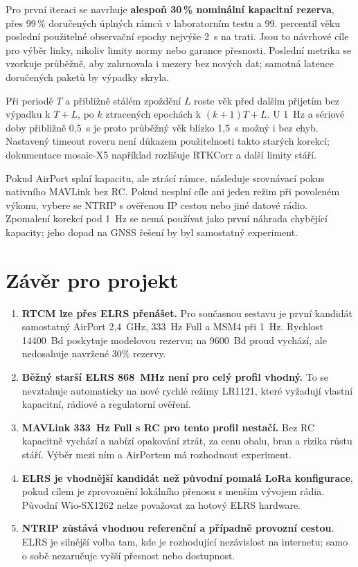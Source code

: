 \documentclass[11pt,a4paper]{article}
\begin{document}
Pro první iteraci se navrhuje \textbf{alespoň 30\,\% nominální kapacitní rezerva}, přes 99\,\% doručených úplných rámců v laboratorním testu a 99. percentil věku poslední použitelné observační epochy nejvýše 2~s na trati. Jsou to návrhové cíle pro výběr linky, nikoliv limity normy nebo garance přesnosti. Poslední metrika se vzorkuje průběžně, aby zahrnovala i mezery bez nových dat; samotná latence doručených paketů by výpadky skryla.

Při periodě $T$ a přibližně stálém zpoždění $L$ roste věk před dalším přijetím bez výpadku k $T+L$, po $k$ ztracených epochách k $(k+1)T+L$. U 1~Hz a sériové doby přibližně 0,5~s je proto průběžný věk blízko 1,5~s možný i bez chyb. Nastavený timeout roveru není důkazem použitelnosti takto starých korekcí; dokumentace mosaic-X5 například rozlišuje RTKCorr a další limity stáří.\cite{mosaic}

Pokud AirPort splní kapacitu, ale ztrácí rámce, následuje srovnávací pokus nativního MAVLink bez RC. Pokud nesplní cíle ani jeden režim při povoleném výkonu, vybere se NTRIP s ověřenou IP cestou nebo jiné datové rádio. Zpomalení korekcí pod 1~Hz se nemá používat jako první náhrada chybějící kapacity; jeho dopad na GNSS řešení by byl samostatný experiment.

\clearpage
\section{Závěr pro projekt}
\begin{enumerate}
\item \textbf{RTCM lze přes ELRS přenášet.} Pro současnou sestavu je první kandidát samostatný AirPort 2,4~GHz, 333~Hz Full a MSM4 při 1~Hz. Rychlost 14400~Bd poskytuje modelovou rezervu; na 9600~Bd proud vychází, ale nedosahuje navržené 30\% rezervy.
\item \textbf{Běžný starší ELRS 868~MHz není pro celý profil vhodný.} To se nevztahuje automaticky na nové rychlé režimy LR1121, které vyžadují vlastní kapacitní, rádiové a regulatorní ověření.
\item \textbf{MAVLink 333~Hz Full s RC pro tento profil nestačí.} Bez RC kapacitně vychází a nabízí opakování ztrát, za cenu obalu, bran a rizika růstu stáří. Výběr mezi ním a AirPortem má rozhodnout experiment.
\item \textbf{ELRS je vhodnější kandidát než původní pomalá LoRa konfigurace}, pokud cílem je zprovoznění lokálního přenosu s menším vývojem rádia. Původní Wio-SX1262 nelze považovat za hotový ELRS hardware.
\item \textbf{NTRIP zůstává vhodnou referenční a případně provozní cestou}. ELRS je silnější volba tam, kde je rozhodující nezávislost na internetu; samo o sobě nezaručuje vyšší přesnost nebo dostupnost.
\end{enumerate}
\end{document}
